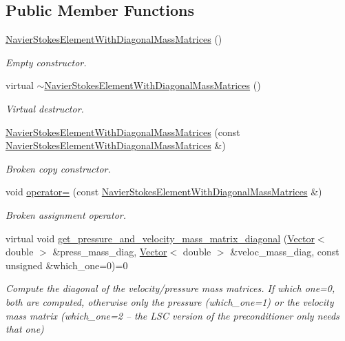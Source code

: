\subsection*{Public Member Functions}
\begin{DoxyCompactItemize}
\item 
\hyperlink{classoomph_1_1NavierStokesElementWithDiagonalMassMatrices_ac7a1a5b65cbc7a5afce8abaf1c3df308}{Navier\+Stokes\+Element\+With\+Diagonal\+Mass\+Matrices} ()
\begin{DoxyCompactList}\small\item\em Empty constructor. \end{DoxyCompactList}\item 
virtual \hyperlink{classoomph_1_1NavierStokesElementWithDiagonalMassMatrices_a52a7a153383615753bf012b09e3745d1}{$\sim$\+Navier\+Stokes\+Element\+With\+Diagonal\+Mass\+Matrices} ()
\begin{DoxyCompactList}\small\item\em Virtual destructor. \end{DoxyCompactList}\item 
\hyperlink{classoomph_1_1NavierStokesElementWithDiagonalMassMatrices_af9eede92585aa6863dd5e7d3340a9d97}{Navier\+Stokes\+Element\+With\+Diagonal\+Mass\+Matrices} (const \hyperlink{classoomph_1_1NavierStokesElementWithDiagonalMassMatrices}{Navier\+Stokes\+Element\+With\+Diagonal\+Mass\+Matrices} \&)
\begin{DoxyCompactList}\small\item\em Broken copy constructor. \end{DoxyCompactList}\item 
void \hyperlink{classoomph_1_1NavierStokesElementWithDiagonalMassMatrices_acb74c30ee5f69d85a27833f49d2594a6}{operator=} (const \hyperlink{classoomph_1_1NavierStokesElementWithDiagonalMassMatrices}{Navier\+Stokes\+Element\+With\+Diagonal\+Mass\+Matrices} \&)
\begin{DoxyCompactList}\small\item\em Broken assignment operator. \end{DoxyCompactList}\item 
virtual void \hyperlink{classoomph_1_1NavierStokesElementWithDiagonalMassMatrices_a4d491d10823eee10381a9b14bce6c244}{get\+\_\+pressure\+\_\+and\+\_\+velocity\+\_\+mass\+\_\+matrix\+\_\+diagonal} (\hyperlink{classoomph_1_1Vector}{Vector}$<$ double $>$ \&press\+\_\+mass\+\_\+diag, \hyperlink{classoomph_1_1Vector}{Vector}$<$ double $>$ \&veloc\+\_\+mass\+\_\+diag, const unsigned \&which\+\_\+one=0)=0
\begin{DoxyCompactList}\small\item\em Compute the diagonal of the velocity/pressure mass matrices. If which one=0, both are computed, otherwise only the pressure (which\+\_\+one=1) or the velocity mass matrix (which\+\_\+one=2 -- the L\+SC version of the preconditioner only needs that one) \end{DoxyCompactList}\end{DoxyCompactItemize}


